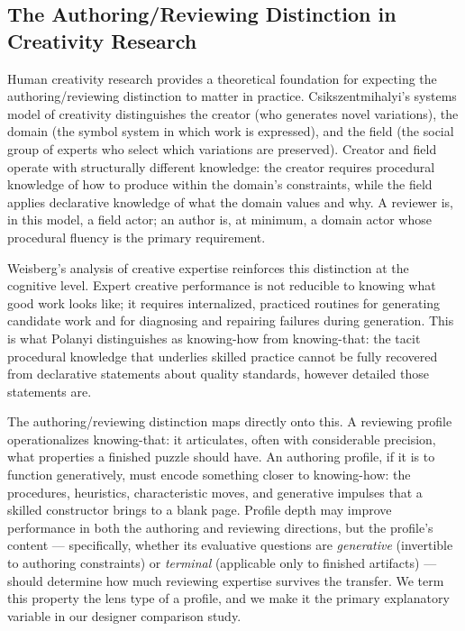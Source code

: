 \subsection{The Authoring/Reviewing Distinction in Creativity Research}

Human creativity research provides a theoretical foundation for expecting the authoring/reviewing distinction to matter in practice. Csikszentmihalyi's systems model of creativity \cite{csikszentmihalyi1997creativity} distinguishes the creator (who generates novel variations), the domain (the symbol system in which work is expressed), and the field (the social group of experts who select which variations are preserved). Creator and field operate with structurally different knowledge: the creator requires procedural knowledge of how to produce within the domain's constraints, while the field applies declarative knowledge of what the domain values and why. A reviewer is, in this model, a field actor; an author is, at minimum, a domain actor whose procedural fluency is the primary requirement.

Weisberg's analysis of creative expertise \cite{weisberg2006creativity} reinforces this distinction at the cognitive level. Expert creative performance is not reducible to knowing what good work looks like; it requires internalized, practiced routines for generating candidate work and for diagnosing and repairing failures during generation. This is what Polanyi \cite{polanyi1966tacit} distinguishes as knowing-how from knowing-that: the tacit procedural knowledge that underlies skilled practice cannot be fully recovered from declarative statements about quality standards, however detailed those statements are.

The authoring/reviewing distinction maps directly onto this. A reviewing profile operationalizes knowing-that: it articulates, often with considerable precision, what properties a finished puzzle should have. An authoring profile, if it is to function generatively, must encode something closer to knowing-how: the procedures, heuristics, characteristic moves, and generative impulses that a skilled constructor brings to a blank page. Profile depth may improve performance in both the authoring and reviewing directions, but the profile's content --- specifically, whether its evaluative questions are \emph{generative} (invertible to authoring constraints) or \emph{terminal} (applicable only to finished artifacts) --- should determine how much reviewing expertise survives the transfer. We term this property the lens type of a profile, and we make it the primary explanatory variable in our designer comparison study.

